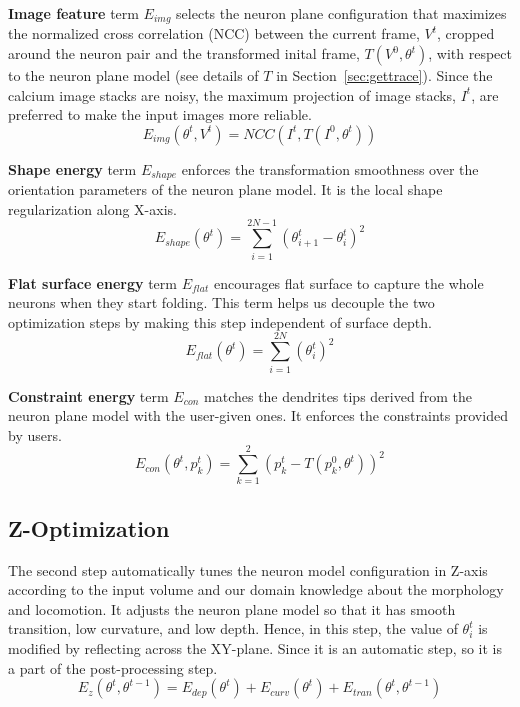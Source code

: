 \documentclass{article}
\begin{document}
\textbf{Image feature} term $E_{img}$ selects the neuron plane configuration that maximizes the normalized cross correlation (NCC) \cite{Yoo2009} between the current frame, $V^t$, cropped around the neuron pair and the transformed inital frame, $T(V^0, \theta^t)$, with respect to the neuron plane model (see details of $T$ in Section~\ref{sec:gettrace}). Since the calcium image stacks are noisy, the maximum projection of image stacks, $I^t$, are preferred to make the input images more reliable. 
\begin{equation} \label{eq:Eimg}
E_{img}(\theta^t,V^t) = NCC(I^t, T(I^0, \theta^t))
\end{equation} 

\textbf{Shape energy} term $E_{shape}$ enforces the transformation smoothness over the orientation parameters of the neuron plane model. It is the local shape regularization along X-axis.
\begin{equation}
E_{shape}(\theta^t) = \sum_{i=1}^{2N-1} (\theta_{i+1}^t - \theta_i^t)^2
\end{equation} 

\textbf{Flat surface energy} term $E_{flat}$ encourages flat surface to capture the whole neurons when they start folding. This term helps us decouple the two optimization steps by making this step independent of surface depth.
\begin{equation}
E_{flat}(\theta^t) = \sum_{i=1}^{2N} (\theta_i^t)^2
\end{equation} 

\textbf{Constraint energy} term $E_{con}$ matches the dendrites tips derived from the neuron plane model with the user-given ones. It enforces the constraints provided by users.
\begin{equation} \label{eq:Econ}
E_{con}(\theta^t, p^t_k) = \sum_{k=1}^{2} (p_k^t - T(p_k^0, \theta^t))^2
\end{equation}


\subsection{Z-Optimization} \label{sec:z-optim}
The second step automatically tunes the neuron model configuration in Z-axis according to the input volume and our domain knowledge about the morphology and locomotion. It adjusts the neuron plane model so that it has smooth transition, low curvature, and low depth. Hence, in this step, the value of $\theta_i^t$ is modified by reflecting across the XY-plane. Since it is an automatic step, so it is a part of the post-processing step.
\begin{equation}
E_{z}(\theta^t,\theta^{t-1}) = E_{dep}(\theta^t) + E_{curv}(\theta^t) + E_{tran}(\theta^t,\theta^{t-1})
\end{equation}
\end{document}
